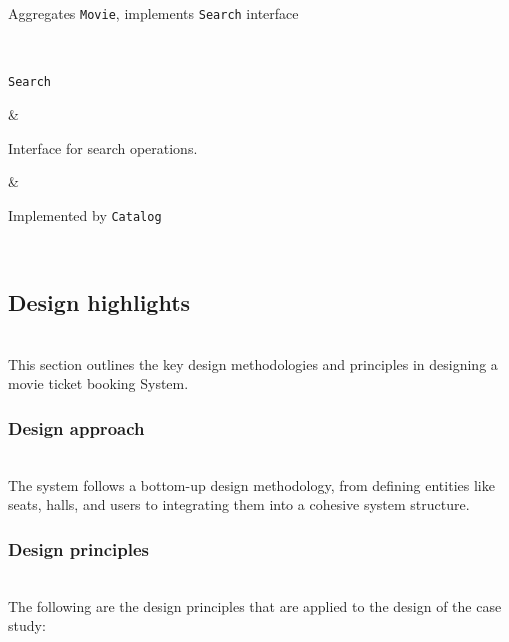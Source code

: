 \begin{center}
{\begin{longtable}[]
\begin{minipage}[t]{\linewidth}
Aggregates \texttt{Movie}, implements \texttt{Search} interface
\end{minipage} \\
\begin{minipage}[t]{\linewidth}\raggedright
\texttt{Search}
\end{minipage} & \begin{minipage}[t]{\linewidth}\raggedright
Interface for search operations.
\end{minipage} & \begin{minipage}[t]{\linewidth}\raggedright
Implemented by \texttt{Catalog}
\end{minipage} \\
\end{longtable}
}
\end{center}

\subsection{Design highlights}\label{WuAtP6dLnkKTvSMUnHb_x}
\\
This section outlines the key design methodologies and principles in designing a movie ticket booking System.

\subsubsection{Design approach}\label{tENzcFZ_sjYwyO2-CP2Pw}
\\
The system follows a bottom-up design methodology, from defining entities like seats, halls, and users to integrating them into a cohesive system structure.

\subsubsection{Design principles}\label{oKiL9B_rk8P9oR_wBg-FR}
\\
The following are the design principles that are applied to the design of the case study:

